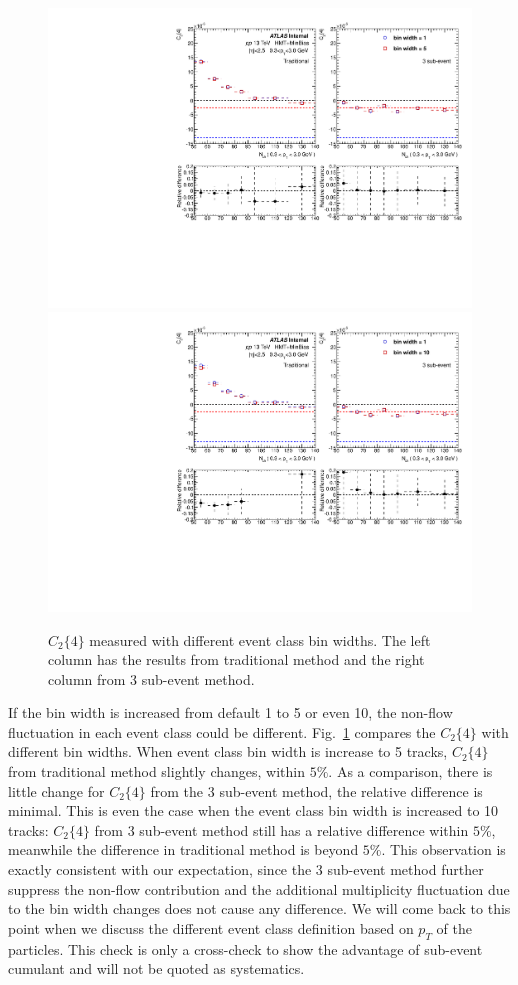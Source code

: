\begin{figure}[H]
\centering
\includegraphics[width=0.8\linewidth]{figs/sec_sys/pp13/sys_pp13_binWidth1.pdf}
\includegraphics[width=0.8\linewidth]{figs/sec_sys/pp13/sys_pp13_binWidth2.pdf}
\caption{$C_{2}\{4\}$ measured with different event class bin widths. The left column has the results from traditional method and the right column from 3 sub-event method.}
\label{fig:sys_pp13_binWidth}
\end{figure}
If the bin width is increased from default 1 to 5 or even 10, the non-flow fluctuation in each event class could be different. Fig.~\ref{fig:sys_pp13_binWidth} compares the $C_{2}\{4\}$ with different bin widths. When event class bin width is increase to 5 tracks, $C_{2}\{4\}$ from traditional method slightly changes, within $5\%$. As a comparison, there is little change for $C_{2}\{4\}$ from the 3 sub-event method, the relative difference is minimal. This is even the case when the event class bin width is increased to 10 tracks: $C_{2}\{4\}$ from 3 sub-event method still has a relative difference within $5\%$, meanwhile the difference in traditional method is beyond $5\%$. This observation is exactly consistent with our expectation, since the 3 sub-event method further suppress the non-flow contribution and the additional multiplicity fluctuation due to the bin width changes does not cause any difference. We will come back to this point when we discuss the different event class definition based on $p_{T}$ of the particles. This check is only a cross-check to show the advantage of sub-event cumulant and will not be quoted as systematics.


